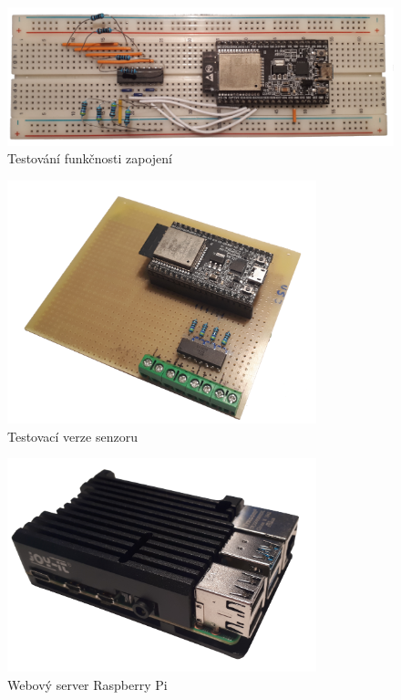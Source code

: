 \begin{figure}[htbp]
    \centering
    \includegraphics[width=\textwidth]{img/nepajivePole.png}
    \caption{Testování funkčnosti zapojení}
    \label{fig:Pletarna}
\end{figure}


\begin{figure}[htbp]
    \centering
    \includegraphics[width=0.8\textwidth]{img/testovaciSenzor.png}
    \caption{Testovací verze senzoru}
    \label{fig:testovaciSenzor}
\end{figure}


\begin{figure}[htbp]
    \centering
    \includegraphics[width=0.8\textwidth]{img/malina.png}
    \caption{Webový server Raspberry Pi}
    \label{fig:malina}
\end{figure}


